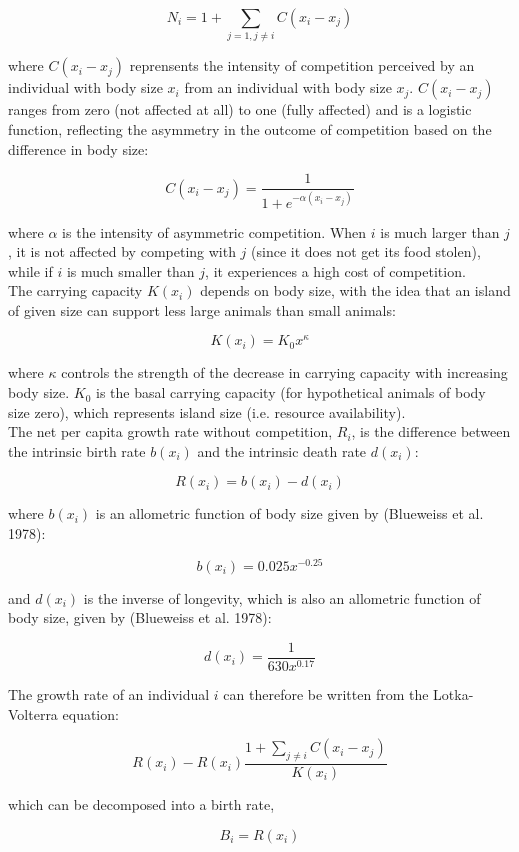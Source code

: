 \documentclass[12pt]{article}
\begin{document}
\[
N_i = 1 + \sum_{j = 1, j \neq i} C(x_i - x_j)
\]

where $C(x_i - x_j)$ reprensents the intensity of competition perceived by an individual with body size $x_i$ from an individual with body size $x_j$. $C(x_i - x_j)$ ranges from zero (not affected at all) to one (fully affected) and is a logistic function, reflecting the asymmetry in the outcome of competition based on the difference in body size:

\[
C(x_i - x_j) = \frac{1}{1 + e ^{-\alpha (x_i - x_j)}}
\]

where $\alpha$ is the intensity of asymmetric competition. When $i$ is much larger than $j$, it is not affected by competing with $j$ (since it does not get its food stolen), while if $i$ is much smaller than $j$, it experiences a high cost of competition.\\

The carrying capacity $K(x_i)$ depends on body size, with the idea that an island of given size can support less large animals than small animals:

\[
K(x_i) = K_0 x ^ \kappa
\]

where $\kappa$ controls the strength of the decrease in carrying capacity with increasing body size. $K_0$ is the basal carrying capacity (for hypothetical animals of body size zero), which represents island size (i.e. resource availability).\\

The net per capita growth rate without competition, $R_i$, is the difference between the intrinsic birth rate $b(x_i)$ and the intrinsic death rate $d(x_i)$:

\[
R(x_i) = b(x_i) - d(x_i)
\]

where $b(x_i)$ is an allometric function of body size given by (Blueweiss et al. 1978):

\[
b(x_i) = 0.025 x ^{-0.25}
\]

and $d(x_i)$ is the inverse of longevity, which is also an allometric function of body size, given by (Blueweiss et al. 1978):

\[
d(x_i) = \frac{1}{630 x ^ {0.17}}
\]

The growth rate of an individual $i$ can therefore be written from the Lotka-Volterra equation:

\[
R(x_i) - R(x_i) \frac{1 + \sum_{j \neq i} C(x_i - x_j)}{K(x_i)}
\]

which can be decomposed into a birth rate,

\[
B_i = R(x_i)
\]
\end{document}
